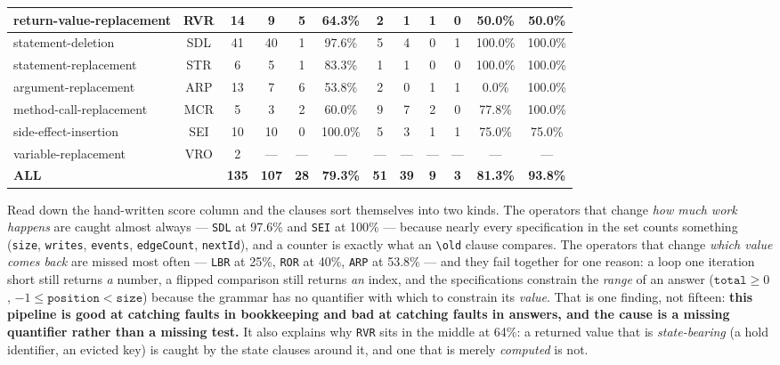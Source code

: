 \documentclass[conference]{IEEEtran}
\begin{document}
\begin{table}[t]
\begin{tabular}{|l|c|c|c|c|c|c|c|c|c|c|c|}
\hline
return-value-replacement & RVR & 14 & 9 & 5 & 64.3\% & 2 & 1 & 1 & 0 & 50.0\% & 50.0\% \\
\hline
statement-deletion & SDL & 41 & 40 & 1 & 97.6\% & 5 & 4 & 0 & 1 & 100.0\% & 100.0\% \\
\hline
statement-replacement & STR & 6 & 5 & 1 & 83.3\% & 1 & 1 & 0 & 0 & 100.0\% & 100.0\% \\
\hline
argument-replacement & ARP & 13 & 7 & 6 & 53.8\% & 2 & 0 & 1 & 1 & 0.0\% & 100.0\% \\
\hline
method-call-replacement & MCR & 5 & 3 & 2 & 60.0\% & 9 & 7 & 2 & 0 & 77.8\% & 100.0\% \\
\hline
side-effect-insertion & SEI & 10 & 10 & 0 & 100.0\% & 5 & 3 & 1 & 1 & 75.0\% & 75.0\% \\
\hline
variable-replacement & VRO & 2 & --- & --- & --- & --- & --- & --- & --- & --- & --- \\
\hline
\textbf{ALL} & & \textbf{135} & \textbf{107} & \textbf{28} & \textbf{79.3\%} & \textbf{51} & \textbf{39} & \textbf{9} & \textbf{3} & \textbf{81.3\%} & \textbf{93.8\%} \\
\hline
\end{tabular}
\end{table}

Read down the hand-written score column and the clauses sort themselves into two
kinds. The operators that change \emph{how much work happens} are caught almost
always --- \texttt{SDL} at 97.6\% and \texttt{SEI} at 100\% --- because nearly every
specification in the set counts something (\texttt{size}, \texttt{writes},
\texttt{events}, \texttt{edgeCount}, \texttt{nextId}), and a counter is exactly what an
\texttt{\textbackslash old} clause compares. The operators that change \emph{which
value comes back} are missed most often --- \texttt{LBR} at 25\%, \texttt{ROR} at 40\%,
\texttt{ARP} at 53.8\% --- and they fail together for one reason: a loop one iteration
short still returns \emph{a} number, a flipped comparison still returns \emph{an} index,
and the specifications constrain the \emph{range} of an answer
($\texttt{total} \geq 0$, $-1 \leq \texttt{position} < \texttt{size}$) because the
grammar has no quantifier with which to constrain its \emph{value}. That is one
finding, not fifteen: \textbf{this pipeline is good at catching faults in bookkeeping
and bad at catching faults in answers, and the cause is a missing quantifier rather
than a missing test.} It also explains why \texttt{RVR} sits in the middle at 64\%: a
returned value that is \emph{state-bearing} (a hold identifier, an evicted key) is
caught by the state clauses around it, and one that is merely \emph{computed} is not.
\end{document}
